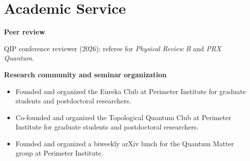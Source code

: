 \documentclass[10pt,letterpaper]{article}
\begin{document}
\newpage
\section{Academic Service}
\textbf{Peer review}\par
QIP conference reviewer (2026); referee for \textit{Physical Review B} and \textit{PRX Quantum}.\par
\vspace{7pt}
\textbf{Research community and seminar organization}\par
\begin{itemize}
\item Founded and organized the Eureka Club at Perimeter Institute for graduate students and postdoctoral researchers.
\item Co-founded and organized the Topological Quantum Club at Perimeter Institute for graduate students and postdoctoral researchers.
\item Founded and organized a biweekly arXiv lunch for the Quantum Matter group at Perimeter Institute.
\end{itemize}
\end{document}

